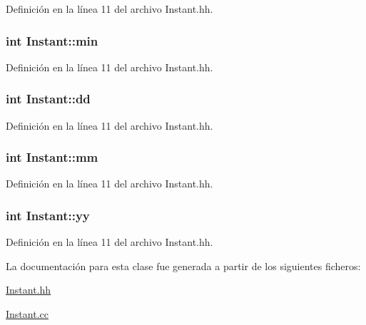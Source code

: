Definición en la línea 11 del archivo Instant.\-hh.

\hypertarget{class_instant_a4de33b0ded8540ec7a903ab5763eccca}{
\subsubsection[{min}]{\setlength{\rightskip}{0pt plus 5cm}int Instant\-::min\hspace{0.3cm}{\ttfamily [private]}}}\label{class_instant_a4de33b0ded8540ec7a903ab5763eccca}


Definición en la línea 11 del archivo Instant.\-hh.

\hypertarget{class_instant_acc6e1db1f2f2f12a87a865d6849f1b2b}{
\subsubsection[{dd}]{\setlength{\rightskip}{0pt plus 5cm}int Instant\-::dd\hspace{0.3cm}{\ttfamily [private]}}}\label{class_instant_acc6e1db1f2f2f12a87a865d6849f1b2b}


Definición en la línea 11 del archivo Instant.\-hh.

\hypertarget{class_instant_a2912b4df6ae47c81da8f5e041ddc2266}{
\subsubsection[{mm}]{\setlength{\rightskip}{0pt plus 5cm}int Instant\-::mm\hspace{0.3cm}{\ttfamily [private]}}}\label{class_instant_a2912b4df6ae47c81da8f5e041ddc2266}


Definición en la línea 11 del archivo Instant.\-hh.

\hypertarget{class_instant_a67fe547756040a8d5d9088c9827bedba}{
\subsubsection[{yy}]{\setlength{\rightskip}{0pt plus 5cm}int Instant\-::yy\hspace{0.3cm}{\ttfamily [private]}}}\label{class_instant_a67fe547756040a8d5d9088c9827bedba}


Definición en la línea 11 del archivo Instant.\-hh.



La documentación para esta clase fue generada a partir de los siguientes ficheros\-:\begin{DoxyCompactItemize}
\item 
\hyperlink{_instant_8hh}{Instant.\-hh}\item 
\hyperlink{_instant_8cc}{Instant.\-cc}\end{DoxyCompactItemize}
